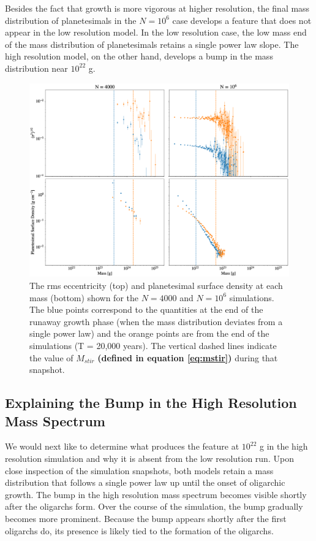 Besides the fact that growth is more vigorous at higher resolution, the final mass distribution of planetesimals in the $N = 10^{6}$ 
case develops a feature that does not appear in the low resolution model. In the low resolution case, the low mass end of the 
mass distribution of planetesimals retains a single power law slope. The high resolution model, on the other hand, develops a 
bump in the mass distribution near $10^{22}$ g.

\begin{figure}
    \includegraphics[width=\textwidth]{figures/plSS/ecc_den_evo.eps}
    \caption{The rms eccentricity (top) and planetesimal surface density at each mass (bottom) shown for the $N = 4000$ and 
    $N = 10^6$ simulations. The blue points correspond to the quantities at the end of the runaway growth phase (when the 
    mass distribution deviates from a single power law) and the orange points are from the end of the simulations (T = 20,000 
    years). The vertical dashed lines indicate the value of $M_{stir}$ \textbf{(defined in equation \ref{eq:mstir})} during that snapshot.}
    \label{fig:ecc_den_evo}
\end{figure}

\subsection{Explaining the Bump in the High Resolution Mass Spectrum}\label{sec:bump}

We would next like to determine what produces the feature at $10^{22}$ g in the high resolution simulation and why it is absent 
from the low resolution run. Upon close inspection of the simulation snapshots, both models retain a mass distribution that 
follows a single power law up until the onset of oligarchic growth. The bump in the high resolution mass spectrum becomes 
visible shortly after the oligarchs form. Over the course of the simulation, the bump gradually becomes more prominent. Because 
the bump appears shortly after the first oligarchs do, its presence is likely tied to the formation of the oligarchs.

